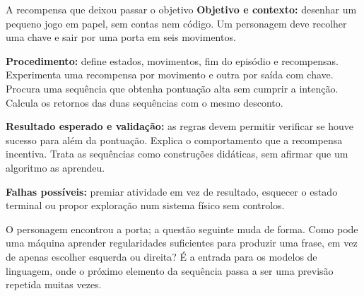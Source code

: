 \begin{promptlabbox}{A recompensa que deixou passar o objetivo}
\textbf{Objetivo e contexto:} desenhar um pequeno jogo em papel, sem contas nem código. Um personagem deve recolher uma chave e sair por uma porta em seis movimentos.

\textbf{Procedimento:} define estados, movimentos, fim do episódio e recompensas. Experimenta uma recompensa por movimento e outra por saída com chave. Procura uma sequência que obtenha pontuação alta sem cumprir a intenção. Calcula os retornos das duas sequências com o mesmo desconto.

\textbf{Resultado esperado e validação:} as regras devem permitir verificar se houve sucesso para além da pontuação. Explica o comportamento que a recompensa incentiva. Trata as sequências como construções didáticas, sem afirmar que um algoritmo as aprendeu.

\textbf{Falhas possíveis:} premiar atividade em vez de resultado, esquecer o estado terminal ou propor exploração num sistema físico sem controlos.
\end{promptlabbox}

O personagem encontrou a porta; a questão seguinte muda de forma. Como pode uma máquina aprender regularidades suficientes para produzir uma frase, em vez de apenas escolher esquerda ou direita? É a entrada para os modelos de linguagem, onde o próximo elemento da sequência passa a ser uma previsão repetida muitas vezes.
